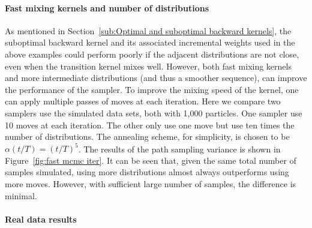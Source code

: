 \paragraph{Fast mixing \mcmc kernels and number of distributions}

As mentioned in Section~\ref{sub:Optimal and suboptimal backward kernels}, the suboptimal backward kernel and its associated incremental weights used in the above examples could perform poorly if the adjacent distributions are not close, even when the transition kernel mixes well. However, both fast mixing kernels and more intermediate distributions (and thus a smoother sequence), can improve the performance of the sampler. To improve the mixing speed of the kernel, one can apply multiple passes of \mcmc moves at each iteration. Here we compare two samplers use the simulated data sets, both with 1,000 particles. One sampler use 10 \mcmc moves at each iteration. The other only use one \mcmc move but use ten times the number of distributions. The annealing scheme, for simplicity, is chosen to be $\alpha(t/T) = (t/T)^5$. The results of the path sampling variance is shown in Figure~\ref{fig:fast mcmc iter}. It can be seen that, given the same total number of samples simulated, using more distributions almost always outperforms using more \mcmc moves. However, with sufficient large number of samples, the difference is minimal.



\paragraph{Real data results}

